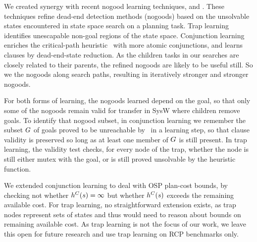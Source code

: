 We created synergy with recent nogood learning techniques,
 \cite{steinmetz:hoffmann:ai-17} and
 \cite{steinmetz:hoffmann:ijcai-17}. These
techniques refine dead-end detection methods (nogoods) based on the
unsolvable states encountered in state space search on a planning
task. Trap learning identifies unescapable non-goal regions of the
state space. Conjunction learning enriches the critical-path heuristic
\hc\ with more atomic conjunctions, and learns clauses by
dead-end-state reduction. As the children tasks in our searches are
closely related to their parents, the refined nogoods are likely to be
useful still. So we  the nogoods along search paths,
resulting in iteratively stronger and stronger nogoods.

For both forms of learning, the nogoods learned depend on the goal, so
that only some of the nogoods remain valid for transfer in SysW where
children remove goals. To identify that nogood subset, in conjunction
learning we remember the subset $G$ of goals proved to be
unreachable by \hc\ in a learning step, so that clause validity is
preserved so long as at least one member of $G$ is still
present. In trap learning, the validity test checks, for every node of
the trap, whether the node is still either mutex with the goal, or is
still proved unsolvable by the heuristic function.

We extended conjunction learning to deal with OSP plan-cost bounds, by
checking not whether $h^C(s)=\infty$ but whether $h^C(s)$ exceeds the
remaining available cost. For trap learning, no straightforward
extension exists, as trap nodes represent sets of states and thus
would need to reason about bounds on remaining available cost. As trap
learning is not the focus of our work, we leave this open for future
research and use trap learning on RCP benchmarks only.

